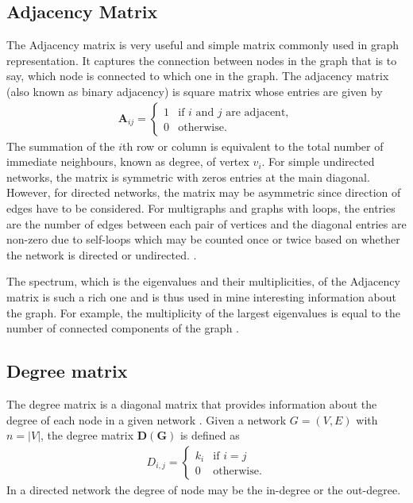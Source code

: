 \documentclass[10pt,a4paper]{article}
\begin{document}
\subsection{Adjacency Matrix}
The Adjacency matrix is very useful and simple matrix commonly used in graph representation. It captures the connection between nodes in the graph that is to say, which node is connected to which one in the graph. The adjacency matrix (also known as binary adjacency) is square matrix whose entries are given by
\begin{eqnarray}
\mathbf{A}_{ij} = \begin{cases} 1 &\mbox{if } i \text{ and } j \text{ are adjacent}, \\
0 & \text{otherwise}.
\end{cases}
\end{eqnarray}
The summation of the $i$th row or column is equivalent to the total number of immediate neighbours, known as degree, of  vertex $v_i$. For simple undirected networks, the matrix is symmetric with zeros entries at the main diagonal. However, for directed networks, the matrix may be asymmetric since direction of edges have to be considered. For multigraphs and graphs with loops, the entries  are the number of edges between each pair of vertices and the diagonal entries are non-zero due to self-loops which may be counted once or twice based on whether the network is directed or undirected. \citep{biggs1993algebraic,godsil2001algebraic}.

The spectrum, which is the eigenvalues and their multiplicities, of the Adjacency matrix is such a rich one and is thus used in mine interesting information about the graph. For example, the multiplicity of the largest eigenvalues is equal to the number of connected components of the graph \citep{cvetkovic2004spectral}. 

\subsection{Degree matrix}
	The degree matrix is a diagonal matrix that provides information about the degree of each node in a given network \citep{newman2010networks}. Given a network $G=(V,E)$ with $n=|V|$, the degree matrix $\mathbf{D(G)}$ is defined as
	\begin{eqnarray}
	D_{i,j} =  \begin{cases} k_i &\mbox{if } i = j \\
	0 & \text{otherwise}.
	\end{cases}
	\end{eqnarray}
	In a directed network the degree of node may be the in-degree or the out-degree.
\end{document}
